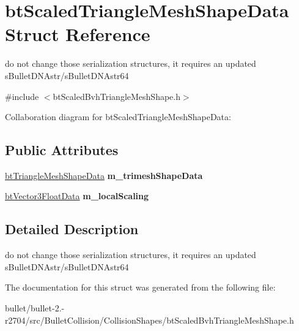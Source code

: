 \hypertarget{structbt_scaled_triangle_mesh_shape_data}{\section{bt\+Scaled\+Triangle\+Mesh\+Shape\+Data Struct Reference}
\label{structbt_scaled_triangle_mesh_shape_data}
}


do not change those serialization structures, it requires an updated s\+Bullet\+D\+N\+Astr/s\+Bullet\+D\+N\+Astr64  




{\ttfamily \#include $<$bt\+Scaled\+Bvh\+Triangle\+Mesh\+Shape.\+h$>$}



Collaboration diagram for bt\+Scaled\+Triangle\+Mesh\+Shape\+Data\+:
\subsection*{Public Attributes}
\begin{DoxyCompactItemize}
\item 
\hypertarget{structbt_scaled_triangle_mesh_shape_data_a1901d68b68ffa98556d3c2d5afa4bd16}{\hyperlink{structbt_triangle_mesh_shape_data}{bt\+Triangle\+Mesh\+Shape\+Data} {\bfseries m\+\_\+trimesh\+Shape\+Data}}\label{structbt_scaled_triangle_mesh_shape_data_a1901d68b68ffa98556d3c2d5afa4bd16}

\item 
\hypertarget{structbt_scaled_triangle_mesh_shape_data_a7524371453a1b12773a65828840f4950}{\hyperlink{structbt_vector3_float_data}{bt\+Vector3\+Float\+Data} {\bfseries m\+\_\+local\+Scaling}}\label{structbt_scaled_triangle_mesh_shape_data_a7524371453a1b12773a65828840f4950}

\end{DoxyCompactItemize}


\subsection{Detailed Description}
do not change those serialization structures, it requires an updated s\+Bullet\+D\+N\+Astr/s\+Bullet\+D\+N\+Astr64 

The documentation for this struct was generated from the following file\+:\begin{DoxyCompactItemize}
\item 
bullet/bullet-\/2.-\/r2704/src/\+Bullet\+Collision/\+Collision\+Shapes/bt\+Scaled\+Bvh\+Triangle\+Mesh\+Shape.\+h\end{DoxyCompactItemize}
